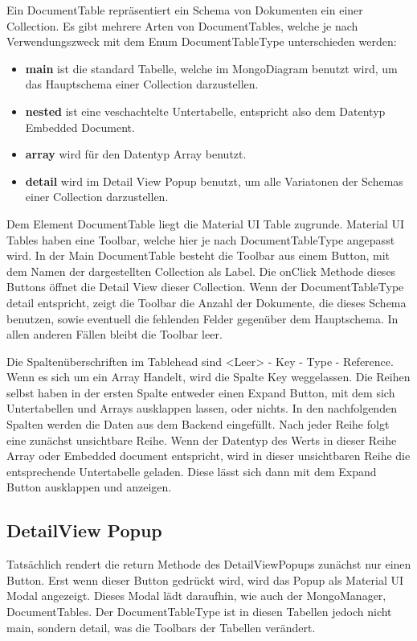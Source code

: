 Ein DocumentTable repräsentiert ein Schema von Dokumenten ein einer Collection.
Es gibt mehrere Arten von DocumentTables, welche je nach Verwendungszweck mit dem Enum DocumentTableType unterschieden werden:
\begin{itemize}
    \item \textbf{main} ist die standard Tabelle, welche im MongoDiagram benutzt wird, um das Hauptschema einer Collection darzustellen.
    \item \textbf{nested} ist eine veschachtelte Untertabelle, entspricht also dem Datentyp Embedded Document.
    \item \textbf{array} wird für den Datentyp Array benutzt.
    \item \textbf{detail} wird im Detail View Popup benutzt, um alle Variatonen der Schemas einer Collection darzustellen.
\end{itemize}

Dem Element DocumentTable liegt die Material UI Table zugrunde.
Material UI Tables haben eine Toolbar, welche hier je nach DocumentTableType angepasst wird.
In der Main DocumentTable besteht die Toolbar aus einem Button, mit dem Namen der dargestellten Collection als Label.
Die onClick Methode dieses Buttons öffnet die Detail View dieser Collection.
Wenn der DocumentTableType detail entspricht, zeigt die Toolbar die Anzahl der Dokumente, die dieses Schema benutzen, sowie eventuell die fehlenden Felder gegenüber dem Hauptschema.
In allen anderen Fällen bleibt die Toolbar leer.

Die Spaltenüberschriften im Tablehead sind <Leer> - Key - Type - Reference.
Wenn es sich um ein Array Handelt, wird die Spalte Key weggelassen.
Die Reihen selbst haben in der ersten Spalte entweder einen Expand Button, mit dem sich Untertabellen und Arrays ausklappen lassen, oder nichts.
In den nachfolgenden Spalten werden die Daten aus dem Backend eingefüllt.
Nach jeder Reihe folgt eine zunächst unsichtbare Reihe.
Wenn der Datentyp des Werts in dieser Reihe Array oder Embedded document entspricht, wird in dieser unsichtbaren Reihe die entsprechende Untertabelle geladen.
Diese lässt sich dann mit dem Expand Button ausklappen und anzeigen.


\subsection{DetailView Popup}
\label{sub:fe_detail_view}

Tatsächlich rendert die return Methode des DetailViewPopups zunächst nur einen Button. 
Erst wenn dieser Button gedrückt wird, wird das Popup als Material UI Modal angezeigt.
Dieses Modal lädt daraufhin, wie auch der MongoManager, DocumentTables.
Der DocumentTableType ist in diesen Tabellen jedoch nicht main, sondern detail, was die Toolbars der Tabellen verändert.


